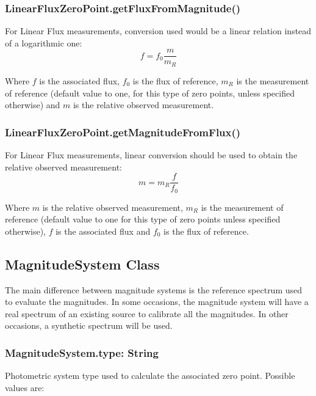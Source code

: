\documentclass[11pt,a4paper]{ivoa}
\begin{document}
\subsubsection{LinearFluxZeroPoint.getFluxFromMagnitude()}
For Linear Flux measurements, conversion used would be a linear 
relation instead of a logarithmic one:
\begin{equation} \label{eq:29}
f = f_0\frac{m}{m_R}
\end{equation}

Where $f$ is the associated flux, $f_0$ is the flux of reference, $m_R$ is 
the measurement of reference (default value to one, for this type of zero 
points, unless specified otherwise) and $m$ is the relative observed 
measurement.
\par

\subsubsection{LinearFluxZeroPoint.getMagnitudeFromFlux()}
For Linear Flux measurements, linear conversion should be used to obtain 
the relative observed measurement:
\begin{equation} \label{eq:30}
m = m_R \frac{f}{f_0}
\end{equation}

Where $m$ is the relative observed measurement, $m_R$ is the measurement 
of reference (default value to one for this type of zero points unless 
specified otherwise), $f$ is the associated flux and $f_0$ is the flux 
of reference.\par

\subsection{MagnitudeSystem Class}
The main difference between magnitude systems is the reference spectrum 
used to evaluate the magnitudes. In some occasions, the magnitude system 
will have a real spectrum of an existing source to calibrate all the magnitudes. 
In other occasions, a synthetic spectrum will be used.
\par

\subsubsection{MagnitudeSystem.type: String}
Photometric system type used to calculate the associated zero point. 
Possible values are:
\par
\end{document}
